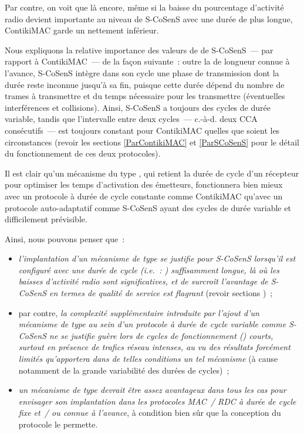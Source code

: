 Par contre, on voit que là encore, même si la baisse du pourcentage
d'activité radio devient importante au niveau de S-CoSenS avec une durée
de  plus longue, ContikiMAC garde un 
nettement inférieur.

\bigskip

Nous expliquons la relative importance des valeurs de  
de S-CoSenS~--- par rapport à ContikiMAC~--- de la façon suivante~:
outre la  de longueur connue à l'avance, S-CoSenS
intègre dans son cycle une phase de transmission dont la durée reste
inconnue jusqu'à sa fin, puisque cette durée dépend du nombre de trames
à transmettre et du temps nécessaire pour les transmettre (éventuelles
interférences et collisions). Ainsi, S-CoSenS a toujours des cycles de
durée variable, tandis que l'intervalle entre deux cycles~--- c.-à-d.
deux CCA consécutifs~--- est toujours constant pour ContikiMAC quelles
que soient les circonstances (revoir les sections \vref{ParContikiMAC} et
\vref{ParSCoSenS} pour le détail du fonctionnement de ces deux protocoles).

Il est clair qu'un mécanisme du type , qui retient
la durée de cycle d'un récepteur pour optimiser les temps d'activation
des émetteurs, fonctionnera bien mieux avec un protocole à durée de cycle
constante comme ContikiMAC qu'avec un protocole auto-adaptatif comme
S-CoSenS ayant des cycles de durée variable et difficilement prévisible.

\bigskip

Ainsi, nous pouvons penser que~:

\begin{itemize}

\item \emph{l'implantation d'un mécanisme de type 
se justifie pour S-CoSenS lorsqu'il est configuré avec une durée de
cycle (i.e.~: ) suffisamment longue, là où les baisses
d'activité radio sont significatives, et de surcroît l'avantage de S-CoSenS
en termes de qualité de service est flagrant} (revoir sections
)~;

\item par contre, \emph{la complexité supplémentaire introduite par l'ajout
d'un mécanisme de type  au sein d'un protocole à durée
de cycle variable comme S-CoSenS ne se justifie guère lors de cycles
de fonctionnement () courts, surtout en présence de
trafics réseau intenses, au vu des résultats forcément limités qu'apportera
dans de telles conditions un tel mécanisme} (à cause notamment de la grande
variabilité des durées de cycles)~;

\item \emph{un mécanisme de type  devrait être assez
avantageux dans tous les cas pour envisager son implantation dans les
protocoles MAC~/ RDC à durée de cycle fixe et~/ ou connue à l'avance},
à condition bien sûr que la conception du protocole le permette.

\end{itemize}

